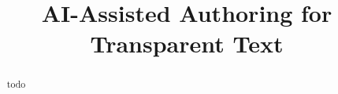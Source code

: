 \documentclass{article}
\begin{document}
\title{AI-Assisted Authoring for Transparent Text}

\maketitle

\begin{abstract}
todo
\end{abstract}







\end{document}

